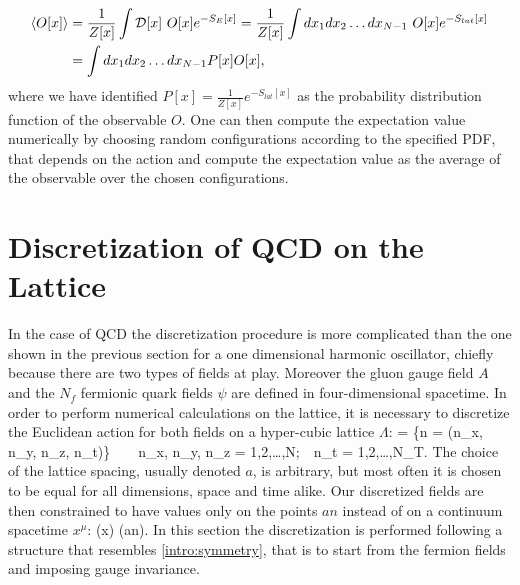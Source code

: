 \begin{align}
    \langle O[x] \rangle &=  \frac{1}{Z[x]} \int \mathcal{D}[x] ~O[x] e^{-S_{E}[x]} = \frac{1}{Z[x]} \int dx_1 dx_2\dots dx_{N-1}~O[x]e^{-S_{lat}[x]}  \\\nonumber
    &=\int dx_1 dx_2\dots dx_{N-1} P[x] O[x],
\end{align}
where we have identified $P[x] = \frac{1}{Z[x]}e^{-S_{lat}[x]}$ as the probability distribution function of the observable $O$. One can then compute the expectation value numerically by choosing random configurations according to the specified PDF, that depends on the action and compute the expectation value as the average of the observable over the chosen configurations.


\section{Discretization of QCD on the Lattice}
\label{sec:lattice_discretize}
In the case of QCD the discretization procedure is more complicated than the one shown in the previous section for a one dimensional harmonic oscillator, chiefly because there are two types of fields at play. Moreover the gluon gauge field $A$ and the $N_f$ fermionic quark fields $\psi$ are defined in four-dimensional spacetime. In order to perform numerical calculations on the lattice, it is necessary to discretize the Euclidean action for both fields on a hyper-cubic lattice $\Lambda$:
\beq
    \Lambda = \{n = (n_x, n_y, n_z, n_t)\}~~~~n_x, n_y, n_z = 1,2,\dots,N;~~n_t = 1,2,\dots,N_T.
\eeq
The choice of the lattice spacing, usually denoted $a$, is arbitrary, but most often it is chosen to be equal for all dimensions, space and time alike. Our discretized fields are then constrained to have values only on the points $an$ instead of on a continuum spacetime $x^\mu$:
\beq
    \phi(x)  \phi(an).
\eeq
In this section the discretization is performed following a structure that resembles \cref{intro:symmetry}, that is to start from the fermion fields and imposing gauge invariance.

